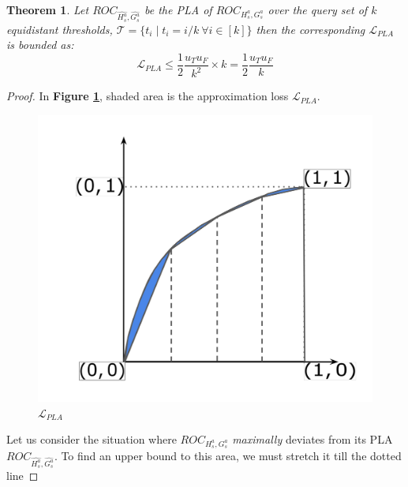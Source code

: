 \documentclass{article}
\newtheorem{theorem}{Theorem}[section]
\newcommand{\sd}[1]{ \textcolor{orange}{{\bf SD: }{``\em #1''}}}
\begin{document}
\begin{theorem} \label{th:pla}
Let $ROC_{\widehat{H_s^a}, \widehat{G_s^a}}$ be the \emph{PLA} of $ROC_{H_s^a,G_s^a}$ over the query set of $k$ equidistant thresholds, $\mathcal{T} = \{ t_i \mid t_i = i/k \ \forall i \in [k] \}$ then the corresponding $\mathcal{L}_{PLA}$ is bounded as:
\begin{equation*}
    \mathcal{L}_{PLA} \le \frac{1}{2} \frac{u_T u_F}{k^2} \times k  = \frac{1}{2} \frac{u_T u_F}{k}
\end{equation*}
\end{theorem}

\begin{proof}

In \textbf{Figure \ref{fig:PLA_p1}}, shaded area is the approximation loss $\mathcal{L}_{PLA}$. 
\begin{figure}[!h]
    \centering
    \includegraphics[scale = 0.06]{diagrams/PLA_modified_2.jpg}
    \caption{$\mathcal{L}_{PLA}$}
    \label{fig:PLA_p1}
\end{figure}
Let us consider the situation where $ROC_{H_s^a, G_s^a}$ \emph{maximally} deviates from its PLA $ROC_{\widehat{H_s^a}, \widehat{G_s^a}}$. To find an upper bound to this area, we must stretch it till the dotted line 




\end{proof}
\end{document}

